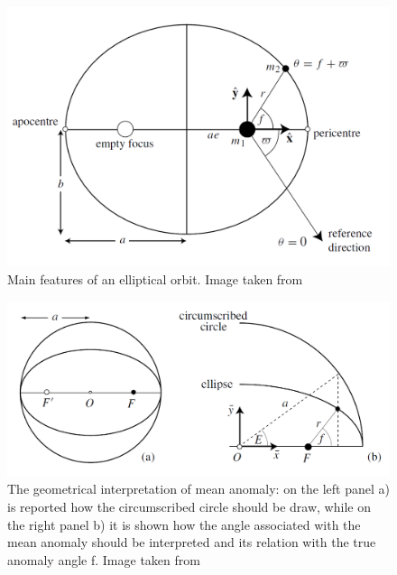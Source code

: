 \documentclass[12pt,%
               a4paper,%
               oneside,openany,%
               titlepage,%
               headinclude,footinclude,%
               BCOR5mm,%
               cleardoublepage=empty,%
               tablecaptionabove,%
               floatperchapter,
               ]{scrreprt}                 %
\begin{document}
\begin{figure}[h]
\begin{center}
\includegraphics[width=1\textwidth]{Figures/Elliptical_orbit.png}
\caption{Main features of an elliptical orbit. Image taken from \cite{murray1999solar}}
\label{Elliptical_orbit}
\end{center}
\end{figure}

\begin{figure}[h]
\begin{center}
\includegraphics[width=1\textwidth]{Figures/Mean_anomaly.png}
\caption{The geometrical interpretation of mean anomaly: on the left panel a) is reported how the circumscribed circle should be draw, while on the right panel b) it is shown how the angle associated with the mean anomaly should be interpreted and its relation with the true anomaly angle f. Image taken from \cite{murray1999solar}}
\label{Mean_anomaly}
\end{center}
\end{figure}
\end{document}
